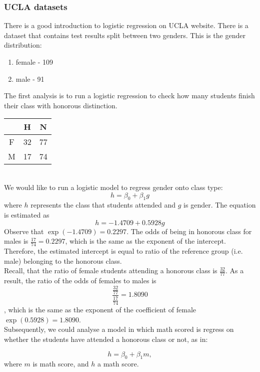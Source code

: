 \documentclass{article}
\begin{document}
\subsubsection{UCLA datasets}
There is a good introduction to logistic regression on UCLA website. There is a dataset that contains test results split between two genders. This is the gender distribution:
\begin{enumerate}
\item female - 109
\item male - 91
\end{enumerate}
The first analysis is to run a logistic regression to check how many students finish their class with honorous distinction.
\\
\begin{tabular}{|c|c|c|}
\hline 
& H & N \\ 
\hline 
F & 32 & 77 \\ 
\hline 
M & 17 & 74 \\
\hline 
\end{tabular} 
\\
We would like to run a logistic model to regress gender onto class type:
\begin{equation}
 h = \beta_0 + \beta_1g
\end{equation}
where $h$ represents the class that students attended and $g$ is gender.
The equation is estimated as
\begin{equation}
 h = -1.4709 + 0.5928g
\end{equation}
Observe that $\exp(-1.4709) = 0.2297$. The odds of being in honorous class for males is $\frac{17}{74}=0.2297 $, which is the same as the exponent of the intercept. Therefore, the estimated intercept is equal to ratio of the reference group (i.e. male) belonging to the honorous class.
\\
\indent Recall, that the ratio of female students attending a honorous class is $\frac{32}{77}$. As a result, the ratio of the odds of females to males is 
\begin{equation}
 \frac{\frac{32}{77}}{\frac{17}{74}} = 1.8090
\end{equation}, which is the same as the exponent of the coefficient of female $\exp(0.5928) = 1.8090$.
\\
\indent
Subsequently, we could analyse a model in which math scored is regress on whether the students have attended a honorous class or not, as in:

\begin{equation}
 h = \beta_0 + \beta_1m  ,
\end{equation}
where $m$ is math score, and $h$ a math score.
\end{document}
